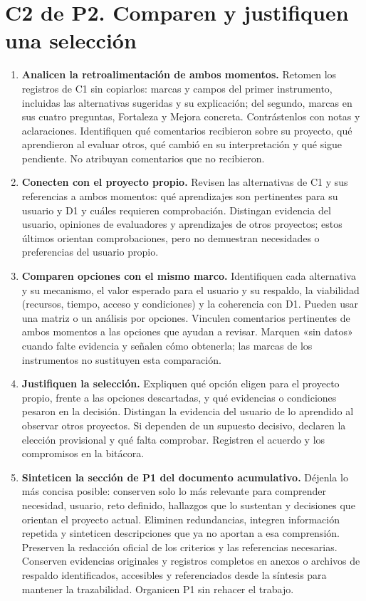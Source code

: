 \section*{C2 de P2. Comparen y justifiquen una selección}
\begin{enumerate}[resume=pasos]
\item \textbf{Analicen la retroalimentación de ambos momentos.} Retomen los registros de C1 sin copiarlos: marcas y campos del primer instrumento, incluidas las alternativas sugeridas y su explicación; del segundo, marcas en sus cuatro preguntas, Fortaleza y Mejora concreta. Contrástenlos con notas y aclaraciones. Identifiquen qué comentarios recibieron sobre su proyecto, qué aprendieron al evaluar otros, qué cambió en su interpretación y qué sigue pendiente. No atribuyan comentarios que no recibieron.
\item \textbf{Conecten con el proyecto propio.} Revisen las alternativas de C1 y sus referencias a ambos momentos: qué aprendizajes son pertinentes para su usuario y D1 y cuáles requieren comprobación. Distingan evidencia del usuario, opiniones de evaluadores y aprendizajes de otros proyectos; estos últimos orientan comprobaciones, pero no demuestran necesidades o preferencias del usuario propio.
\item \textbf{Comparen opciones con el mismo marco.} Identifiquen cada alternativa y su mecanismo, el valor esperado para el usuario y su respaldo, la viabilidad (recursos, tiempo, acceso y condiciones) y la coherencia con D1. Pueden usar una matriz o un análisis por opciones. Vinculen comentarios pertinentes de ambos momentos a las opciones que ayudan a revisar. Marquen «sin datos» cuando falte evidencia y señalen cómo obtenerla; las marcas de los instrumentos no sustituyen esta comparación.
\item \textbf{Justifiquen la selección.} Expliquen qué opción eligen para el proyecto propio, frente a las opciones descartadas, y qué evidencias o condiciones pesaron en la decisión. Distingan la evidencia del usuario de lo aprendido al observar otros proyectos. Si dependen de un supuesto decisivo, declaren la elección provisional y qué falta comprobar. Registren el acuerdo y los compromisos en la bitácora.
\item \textbf{Sinteticen la sección de P1 del documento acumulativo.} Déjenla lo más concisa posible: conserven solo lo más relevante para comprender necesidad, usuario, reto definido, hallazgos que lo sustentan y decisiones que orientan el proyecto actual. Eliminen redundancias, integren información repetida y sinteticen descripciones que ya no aportan a esa comprensión. Preserven la redacción oficial de los criterios y las referencias necesarias. Conserven evidencias originales y registros completos en anexos o archivos de respaldo identificados, accesibles y referenciados desde la síntesis para mantener la trazabilidad. Organicen P1 sin rehacer el trabajo.
\end{enumerate}

